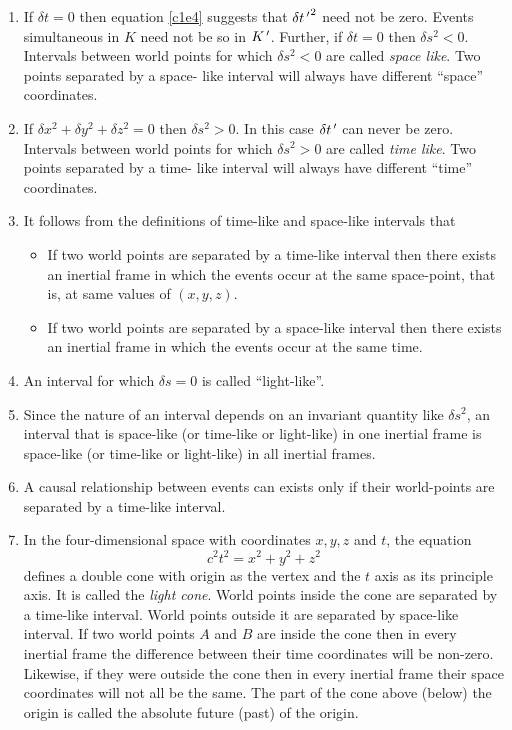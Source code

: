 \begin{enumerate}
\item If $\delta t = 0$ then equation \eqref{c1e4} suggests that $\delta {t^{\,\prime}}^2$
need not be zero. Events simultaneous in $K$ need not be so in $K^{\,\prime}$. Further, if
$\delta t = 0$ then $\delta s^2 < 0$. Intervals between world points for which 
$\delta s^2 < 0$ are called \emph{space like}. Two points separated by a space-
like interval will always have different ``space'' coordinates.

\item If $\delta x^2 + \delta y^2 + \delta z^2 = 0$ then $\delta s^2 > 0$. In this
case $\delta t^{\,\prime}$ can never be zero. Intervals between world points for which 
$\delta s^2 > 0$ are called \emph{time like}. Two points separated by a time-
like interval will always have different ``time'' coordinates.

\item It follows from the definitions of time-like and space-like intervals that
\begin{itemize}
\item If two world points are separated by a time-like interval then there exists
an inertial frame in which the events occur at the same space-point, that is, at
same values of $(x, y, z)$.
\item If two world points are separated by a space-like interval then there exists
an inertial frame in which the events occur at the same time.
\end{itemize}

\item An interval for which $\delta s = 0$ is called ``light-like''.

\item Since the nature of an interval depends on an invariant quantity like
$\delta s^2$, an interval that is space-like (or time-like or light-like) in one
inertial frame is space-like (or time-like or light-like) in all inertial frames.

\item A causal relationship between events can exists only if their world-points
are separated by a time-like interval.

\item In the four-dimensional space with coordinates $x, y, z$ and $t$, the equation
\begin{equation}\label{c1e6}
c^2t^2 = x^2 + y^2 + z^2
\end{equation}
defines a double cone with origin as the vertex and the $t$ axis as its principle
axis. It is called the \emph{light cone}. 
World points inside the cone are separated by a time-like interval. World
points outside it are separated by space-like interval. If two world points $A$
and $B$ are inside the cone then in every inertial frame the difference between
their time coordinates will be non-zero. Likewise, if they were outside the cone
then in every inertial frame their space coordinates will not all be the same.
The part of the cone above (below) the origin is called the absolute future 
(past) of the origin.


\end{enumerate}
